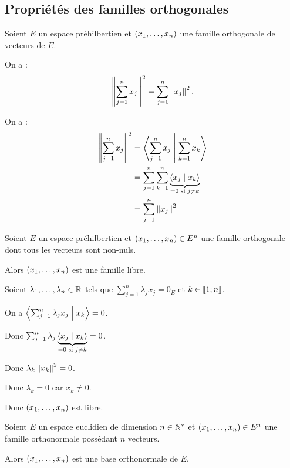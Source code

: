 \subsection{Propriétés des familles orthogonales}

\begin{theo}
Soient \(E\) un espace préhilbertien et \(\left(x_1,\dots,x_n\right)\) une famille orthogonale de vecteurs de \(E\).

On a : \[\left\|\sum_{j=1}^{n}x_j\right\|^2=\sum_{j=1}^{n}\left\|x_j\right\|^2.\]
\end{theo}

\begin{dem}
On a : \[\begin{aligned}
\left\|\sum_{j=1}^{n}x_j\right\|^2&=\left\langle\sum_{j=1}^{n}x_j\;\middle|\;\sum_{k=1}^{n}x_k\right\rangle \\
&=\sum_{j=1}^{n}\sum_{k=1}^{n}\underbrace{\left\langle x_j\;\middle|\; x_k\right\rangle}_{=0\text{ si }j\not=k} \\
&=\sum_{j=1}^{n}\left\|x_j\right\|^2
\end{aligned}\]
\end{dem}

\begin{prop}
Soient \(E\) un espace préhilbertien et \(\left(x_1,\dots,x_n\right)\in E^n\) une famille orthogonale dont tous les vecteurs sont non-nuls.

Alors \(\left(x_1,\dots,x_n\right)\) est une famille libre.
\end{prop}

\begin{dem}
Soient \(\lambda_1,\dots,\lambda_n\in\mathbb{R}\) tels que \(\sum_{j=1}^{n}\lambda_jx_j=0_E\) et \(k\in\left\llbracket1;n\right\rrbracket\).

On a \(\left\langle\sum_{j=1}^{n}\lambda_jx_j\;\middle|\; x_k\right\rangle=0\).

Donc \(\sum_{j=1}^{n}\lambda_j\underbrace{\left\langle x_j\;\middle|\; x_k\right\rangle}_{=0\text{ si }j\not=k}=0\).

Donc \(\lambda_k\left\|x_k\right\|^2=0\).

Donc \(\lambda_k=0\) car \(x_k\not=0\).

Donc \(\left(x_1,\dots,x_n\right)\) est libre.
\end{dem}

\begin{prop}
Soient \(E\) un espace euclidien de dimension \(n\in\mathbb{N}^*\) et \(\left(x_1,\dots,x_n\right)\in E^n\) une famille orthonormale possédant \(n\) vecteurs.

Alors \(\left(x_1,\dots,x_n\right)\) est une base orthonormale de \(E\).
\end{prop}

